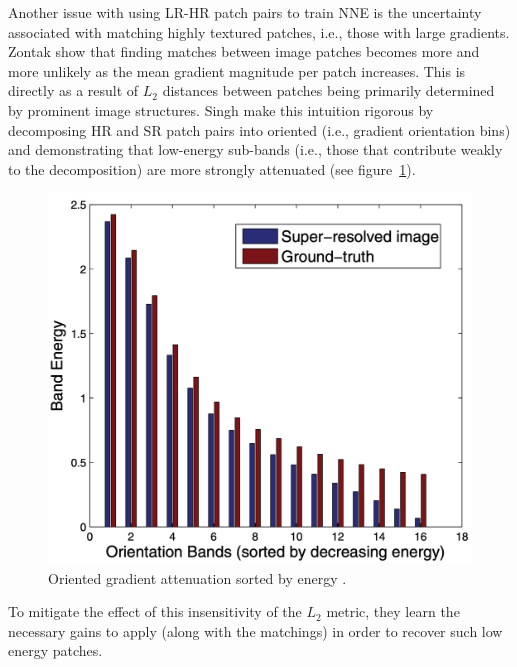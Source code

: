 Another issue with using LR-HR patch pairs to train NNE is the uncertainty associated with matching highly textured patches, i.e., those with large gradients.
%
Zontak \etal \cite{zontak2011internal} show that finding matches between image patches becomes more and more unlikely as the mean gradient magnitude per patch increases.
%
This is directly as a result of \(L_2\) distances between patches being primarily determined by prominent image structures.
%
Singh \etal \cite{singh2014} make this intuition rigorous by decomposing HR and SR patch pairs into oriented  (i.e., gradient orientation bins) and demonstrating that low-energy sub-bands (i.e., those that contribute weakly to the decomposition) are more strongly attenuated (see figure~\ref{fig:subbands}).
\begin{figure}[!htbp]
    \centering
    \begin{adjustbox}{width=\linewidth}
        \centering
        \includegraphics{figures/classical/subbands.png}
    \end{adjustbox}
    \caption{Oriented gradient attenuation sorted by energy \cite{singh2014}.}\label{fig:subbands}
\end{figure}
To mitigate the effect of this insensitivity of the \(L_2\) metric, they learn the necessary gains to apply (along with the matchings) in order to recover such low energy patches.


